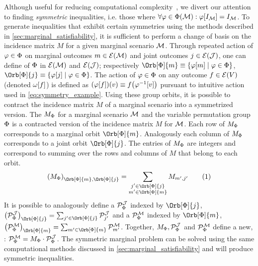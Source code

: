 \documentclass[aps, 10pt, english, twoside, pra, nofootinbib, tightenlines, longbibliography, superscriptaddress]{revtex4-1}
\begin{document}
    Although useful for reducing computational complexity~\cite{Bancal_2010}, we divert our attention to finding \textit{symmetric} inequalities, i.e. those where $\forall \varphi \in \gp\br{\mscenario} :  \varphi\bs{I_{\mscenario}} = I_{\mscenario}$. To generate inequalities that exhibit certain symmetries using the methods described in \cref{sec:marginal_satisfiability}, it is sufficient to perform a change of basis on the incidence matrix $M$ for a given marginal scenario $\mathcal{M}$. Through repeated action of $\varphi \in \Phi$ on marginal outcomes $m \in \Events{\mscenario}$ and joint outcomes $j \in \Events{\jointvar}$, one can define  of $\Phi$ in $\Events{\mscenario}$ and $\Events{\jointvar}$; respectively $\Orb[\gp]{m} \defined \bc{\varphi\bs{m} \mid \varphi \in \gp}$, $\Orb[\gp]{j} \defined \bc{\varphi\bs{j} \mid \varphi \in \gp}$. The action of $\varphi \in \Phi$ on any outcome $f \in \Events{V}$ (denoted $\geo\bs{f}$) is defined as $\br{\varphi\bs{f}}\br{v} \defined f\br{\varphi^{-1}\bs{v}}$ pursuant to intuitive action used in \cref{eq:symmetry_example}. Using these group orbits, it is possible to contract the incidence matrix $M$ of a marginal scenario into a symmetrized version. The  $M_{\Phi}$ for a marginal scenario $\mathcal{M}$ and the variable permutation group $\Phi$ is a contracted version of the incidence matrix $M$ for $\mathcal{M}$. Each row of $M_{\Phi}$ corresponds to a marginal orbit $\Orb[\gp]{m}$. Analogously each column of $M_{\Phi}$ corresponds to a joint orbit $\Orb[\gp]{j}$. The entries of $M_{\Phi}$ are integers and correspond to summing over the rows and columns of $M$ that belong to each orbit.
    \[ \br{M_{\gp}}_{\Orb[\gp]{m}, \Orb[\gp]{j}} = \sum_{\substack{j' \in \Orb[\gp]{j} \\ m' \in \Orb[\gp]{m}}} M_{m',j'} \eq \]
    It is possible to analogously define a  $\probvec^{\jointvar}_{\Phi}$ indexed by $\Orb[\gp]{j}$, $\br{\probvec^{\jointvar}_{\Phi}}_{\Orb[\gp]{j}} = \sum_{j' \in \Orb[\gp]{j}} \probvec^{\jointvar}_{j'}$ and a  $\probvec^{\mscenario}_{\Phi}$ indexed by $\Orb[\gp]{m}$, $\br{\probvec^{\mscenario}_{\Phi}}_{\Orb[\gp]{m}} = \sum_{m' \in \Orb[\gp]{m}} \probvec^{\mscenario}_{m'}$. Together, $M_{\gp}, \probvec^{\jointvar}_{\Phi}$ and $\probvec^{\mscenario}_{\Phi}$ define a new, : $\probvec^{\mscenario}_{\Phi} = M_{\gp} \cdot \probvec^{\jointvar}_{\Phi}$. The symmetric marginal problem can be solved using the same computational methods discussed in \cref{sec:marginal_satisfiability} and will produce symmetric inequalities.
\end{document}
